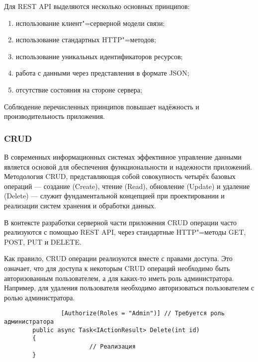 Для REST API выделяются несколько основных принципов:
\begin{enumerate}
	\item{использование клиент"=серверной модели связи;}
	\item{использование стандартных HTTP"=методов;}
	\item{использование уникальных идентификаторов ресурсов;}
	\item{работа с данными через представления в формате JSON;}
	\item{отсутствие состояния на стороне сервера;}
\end{enumerate}

Соблюдение перечисленных принципов повышает надёжность и производительность приложения.

\subsubsection{CRUD}
В современных информационных системах эффективное управление данными является основой для обеспечения функциональности и надежности приложений. Методология CRUD, представляющая собой совокупность четырёх базовых операций --- создание (Create), чтение (Read), обновление (Update) и удаление (Delete) --- служит фундаментальной концепцией при проектировании и реализации систем хранения и обработки данных. 

В контексте разработки серверной части приложения CRUD операции часто реализуются с помощью REST API, через стандартные HTTP"=методы GET, POST, PUT и DELETE.

Как правило, CRUD операции реализуются вместе с правами доступа. Это означает, что для доступа к некоторым CRUD операций необходимо быть авторизованным пользователем, а для каких-то иметь роль администратора. Например, для удаления пользователя необходимо авторизоваться пользователем с ролью администратора.

\begin{verbatim}
				[Authorize(Roles = "Admin")] // Требуется роль администратора
        public async Task<IActionResult> Delete(int id)
        {
						// Реализация
        }
\end{verbatim}
